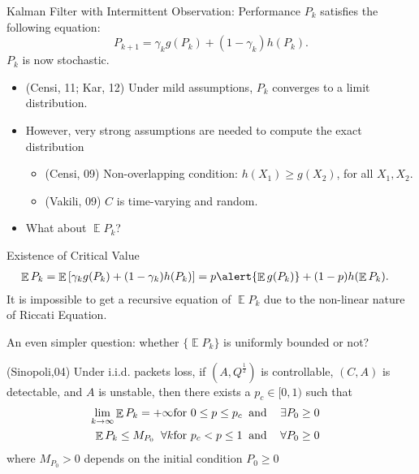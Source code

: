 \documentclass[10pt]{beamer}
\DeclareMathOperator{\E}{\mathbb E}
\begin{document}
  \begin{frame}{Kalman Filter with Intermittent Observation: Performance}
    $P_k$ satisfies the following equation:
    \begin{equation}
      P_{k+1}= \gamma_k g(P_k) + (1-\gamma_k) h(P_k).
      \label{eq:basicricattieqn}
    \end{equation}
    $P_k$ is now stochastic. 
    \begin{itemize}
      \item (Censi, 11; Kar, 12) Under mild assumptions, $P_k$ converges to a limit distribution.
      \item However, very strong assumptions are needed to compute the exact distribution 
	\begin{itemize}
	  \item (Censi, 09) Non-overlapping condition: $h(X_1)\geq g(X_2)$, for all $X_1,X_2$.
	  \item (Vakili, 09) $C$ is time-varying and random.
	\end{itemize}
      \item What about $\E P_k$?
    \end{itemize}
  \end{frame}

  \begin{frame}{Existence of Critical Value}
    \begin{displaymath}
      \begin{split}
	\E P_k &= \E\left[\gamma_k g(P_k) + (1-\gamma_k) h(P_k)\right]= p\alert{\E g(P_k)} + (1-p) h(\E P_k).
      \end{split}
    \end{displaymath}
    It is impossible to get a recursive equation of $\E P_k$ due to the non-linear nature of Riccati Equation. 

    An even simpler question: whether $\{\E P_k\}$ is uniformly bounded or not?
    \begin{theorem}
      (Sinopoli,04) Under i.i.d. packets loss, if $(A,Q^{\frac{1}{2}})$ is controllable, $(C,A)$ is detectable, and $A$ is unstable, then there exists a $p_c\in[0,1)$ such that
      \begin{eqnarray}\label{eqn:lambdaCrit}
	\lim_{k\rightarrow\infty}\E P_k=+\infty & \mbox{for } 0\leq
	p \leq p_c \; \;
	\mbox{and  \hspace{3mm}$\exists P_0 \geq 0$}&\\
	\E P_k \leq M_{P_0} \;\; \forall k & \mbox{for } p_c <
	p \leq 1 \; \; \mbox{and \hspace{3mm}$\forall P_0 \geq 0$}&
      \end{eqnarray}
      where $M_{P_0} > 0 $  depends on the initial condition $P_0 \geq 0$
    \end{theorem}
  \end{frame}
\end{document}
